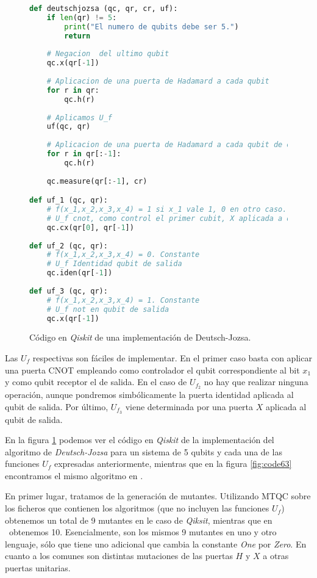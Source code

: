\begin{figure}[!htb]
\begin{lstlisting}[language=Python]
def deutschjozsa (qc, qr, cr, uf):
    if len(qr) != 5:
        print("El numero de qubits debe ser 5.")
        return
    
    # Negacion  del ultimo qubit
    qc.x(qr[-1])
    
    # Aplicacion de una puerta de Hadamard a cada qubit
    for r in qr:
        qc.h(r)
        
    # Aplicamos U_f
    uf(qc, qr)
        
    # Aplicacion de una puerta de Hadamard a cada qubit de entrada
    for r in qr[:-1]:
        qc.h(r)
            
    qc.measure(qr[:-1], cr)

def uf_1 (qc, qr):
    # f(x_1,x_2,x_3,x_4) = 1 si x_1 vale 1, 0 en otro caso. Balanceada
    # U_f cnot, como control el primer cubit, X aplicada a qubit de salida
    qc.cx(qr[0], qr[-1])
    
def uf_2 (qc, qr):
    # f(x_1,x_2,x_3,x_4) = 0. Constante
    # U_f Identidad qubit de salida
    qc.iden(qr[-1])
    
def uf_3 (qc, qr):
    # f(x_1,x_2,x_3,x_4) = 1. Constante
    # U_f not en qubit de salida
    qc.x(qr[-1])
\end{lstlisting}
\caption{Código en \textit{Qiskit} de una implementación de Deutsch-Jozsa.}
\label{fig:code62}
\end{figure}

Las $U_f$ respectivas son fáciles de implementar. En el primer caso basta con aplicar una puerta CNOT empleando como controlador el qubit correspondiente al bit $x_1$ y como qubit receptor el de salida. En el caso de $U_{f_2}$ no hay que realizar ninguna operación, aunque pondremos simbólicamente la puerta identidad aplicada al qubit de salida. Por último, $U_{f_3}$ viene determinada por una puerta $X$ aplicada al qubit de salida.

En la figura \ref{fig:code62} podemos ver el código en \textit{Qiskit} de la implementación del algoritmo de \textit{Deutsch-Jozsa} para un sistema de 5 qubits y cada una de las funciones $U_f$ expresadas anteriormente, mientras que en la figura \ref{fig:code63} encontramos el mismo algoritmo en \qsh.

En primer lugar, tratamos de la generación de mutantes. Utilizando MTQC sobre los ficheros que contienen los algoritmos (que no incluyen las funciones $U_f$) obtenemos un total de 9 mutantes en le caso de \textit{Qiksit}, mientras que en \qsh\ obtenemos 10. Esencialmente, son los mismos 9 mutantes en uno y otro lenguaje, sólo que \qsh tiene uno adicional que cambia la constante \textit{One} por \textit{Zero}. En cuanto a los comunes son distintas mutaciones de las puertas $H$ y $X$ a otras puertas unitarias.

